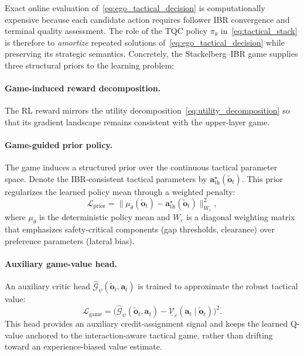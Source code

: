 \documentclass{iopjournal}
\begin{document}
Exact online evaluation of~\eqref{eq:ego_tactical_decision} is
computationally expensive because each candidate action requires follower
IBR convergence and terminal quality assessment.  The role of the TQC policy
$\pi_\theta$ in~\eqref{eq:tactical_stack} is therefore to \emph{amortize}
repeated solutions of~\eqref{eq:ego_tactical_decision} while preserving its
strategic semantics.  Concretely, the Stackelberg--IBR game supplies three
structural priors to the learning problem:

\paragraph{Game-induced reward decomposition.}
The RL reward mirrors the utility decomposition~\eqref{eq:utility_decomposition}
so that its gradient landscape remains consistent with the upper-layer game.

\paragraph{Game-guided prior policy.}
The game induces a structured prior over the continuous tactical parameter
space.  Denote the IBR-consistent tactical parameters by
$\bm{a}_{\mathrm{th}}^\star(\widetilde{\bm{o}}_t)$.  This prior regularizes
the learned policy mean through a weighted penalty:
\begin{equation}
\mathcal{L}_{\mathrm{prior}}=
\bigl\|\mu_\theta(\widetilde{\bm{o}}_t)
-\bm{a}_{\mathrm{th}}^\star(\widetilde{\bm{o}}_t)\bigr\|_{W_c}^2,
\label{eq:prior_mse}
\end{equation}
where $\mu_\theta$ is the deterministic policy mean and $W_c$ is a
diagonal weighting matrix that emphasizes safety-critical components
(gap thresholds, clearance) over preference parameters (lateral bias).

\paragraph{Auxiliary game-value head.}
An auxiliary critic head
$\hat{\mathcal{G}}_\psi(\widetilde{\bm{o}}_t,\bm{a}_t)$ is trained to
approximate the robust tactical value:
\begin{equation}
\mathcal{L}_{\mathrm{game}}=
\bigl(\hat{\mathcal{G}}_\psi(\widetilde{\bm{o}}_t,\bm{a}_t)
-\underline{\mathcal{V}}_e(\bm{a}_t\mid\widetilde{\bm{o}}_t)\bigr)^2.
\label{eq:game_value_loss}
\end{equation}
This head provides an auxiliary credit-assignment signal and keeps the learned Q-value anchored
to the interaction-aware tactical game, rather than drifting toward an
experience-biased value estimate.
\end{document}
